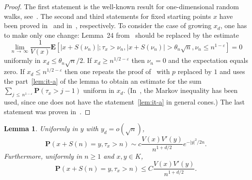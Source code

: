 \documentclass[10pt]{amsart}
\newtheorem{lemm}[theo]{Lemma}\newtheorem{prop}[theo]{Proposition}\newtheorem{coro}[theo]{Corollary}\newtheorem{conj}[theo]{Conjecture}
\theoremstyle{definition}\newtheorem{defi}[theo]{Definition}\newtheorem{rema}[theo]{Remark}\newtheorem{exam}[theo]{Example}\newtheorem{exem}[theo]{Example}\newtheorem{nota}[theo]{Notation}
\newcommand{\pr}{\mathbf{P}}
\newcommand{\e}{\mathbf{E}}
\renewcommand{\le}{\leqslant}
\renewcommand{\ge}{\geqslant}
\begin{document}
\begin{proof}
The first statement is the well-known result for one-dimensional random walks, see~\cite[Corollary~3]{Do-12}. The second and third statements for fixed starting points $x$ have been proved in~\cite{DuWa-20} and in~\cite{DeWa-15}, respectively. To consider the case of growing $x_d$, one has to make only one change: Lemma~24 from~\cite{DeWa-15} should be replaced by the estimate
\[
\lim_{n\,\to\,\infty}\frac{1}{V(x)}
\e\left[\left|x+S(\nu_n)\right|;\tau_x>\nu_n,\left|x+S(\nu_n)\right| >\theta_n\sqrt{n},\nu_n\le n^{1-\varepsilon}\right]=0
\]
uniformly in $x_d\le \theta_n\sqrt{n}/2.$ If $x_d\ge n^{1/2-\varepsilon}$ then $\nu_n=0$ and the expectation equals zero. If $x_d\le n^{1/2-\varepsilon}$ then one repeats the proof of~\cite[Lemma~24]{DeWa-15} with $p$ replaced by $1$ and uses the part~\eqref{lem:it-a} of the lemma to obtain an estimate for the sum $\sum_{j\,\le\, n^{1-\varepsilon}}\pr(\tau_x>j-1)$ uniform in $x_d$. (In~\cite{DeWa-15}, the Markov inequality has been used, since one does not have the statement~\eqref{lem:it-a} in general cones.) The last statement was proven in~\cite[Lemma~3]{DeWa-16}.
\end{proof}


\begin{lemm}\label{lem:half-space-2}
Uniformly in $y$ with $y_d=o(\sqrt{n})$,
\[
\pr\left(x+S(n)=y,\tau_x>n\right)\sim c\frac{V(x)V'(y)}{n^{1+d/2}}e^{-|y|^2/2n}.
\]
Furthermore, uniformly in $n\ge1$ and $x,y\in K$,
\[
\pr\left(x+S(n)=y,\tau_x>n\right)
\le C\frac{V(x)V'(y)}{n^{1+d/2}}.
\]
\end{lemm}
\end{document}
